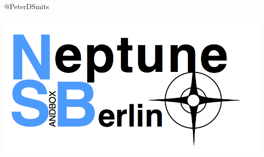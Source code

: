 \documentclass{beamer}
\begin{document}
\begin{frame}
\begin{columns}
\begin{column}{0.5\textwidth}
\begin{center}
        @PeterDSmits
      \end{center}

      \vspace*{0.02\textheight}

      \begin{center}
        \includegraphics[height=0.25\textheight,width=\textwidth,keepaspectratio=true]{figure/nsb_logo}
      \end{center}
    \end{column}
  \end{columns}
\end{frame}
\end{document}
